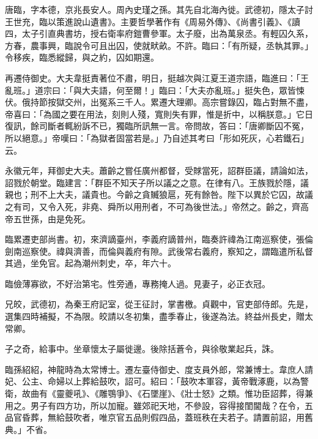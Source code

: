
\begin{pinyinscope}

 唐臨，字本德，京兆長安人。周內史瑾之孫。其先自北海內徙。武德初，隱太子討王世充，臨以策進說山遺書》。主要哲學著作有《周易外傳》、《尚書引義》、《讀四，太子引直典書坊，授右衛率府鎧曹參軍。太子廢，出為萬泉丞。有輕囚久系，方春，農事興，臨說令可且出囚，使就畎畝。不許。臨曰：「有所疑，丞執其罪。」令移疾，臨悉縱歸，與之約，囚如期還。



 再遷侍御史。大夫韋挺責著位不肅，明日，挺越次與江夏王道宗語，臨進曰：「王亂班。」道宗曰：「與大夫語，何至爾！」臨曰：「大夫亦亂班。」挺失色，眾皆悚伏。俄持節按獄交州，出冤系三千人。累遷大理卿。高宗嘗錄囚，臨占對無不盡，帝喜曰：「為國之要在用法，刻則人殘，寬則失有罪，惟是折中，以稱朕意。」它日復訊，餘司斷者輒紛訴不已，獨臨所訊無一言。帝問故，答曰：「唐卿斷囚不冤，所以絕意。」帝嘆曰：「為獄者固當若是。」乃自述其考曰「形如死灰，心若鐵石」云。



 永徽元年，拜御史大夫。蕭齡之嘗任廣州都督，受賕當死，詔群臣議，請論如法，詔戮於朝堂。臨建言：「群臣不知天子所以議之之意。在律有八。王族戮於隱，議親也；刑不上大夫，議貴也。今齡之貪贓狼扈，死有餘咎。陛下以異於它囚，故議之有司，又令入死，非堯、舜所以用刑者，不可為後世法。」帝然之。齡之，齊高帝五世孫，由是免死。



 臨累遷吏部尚書。初，來濟謫臺州，李義府謫普州，臨奏許禕為江南巡察使，張倫劍南巡察使。禕與濟善，而倫與義府有隙。武後常右義府，察知之，謂臨遣所私督其過，坐免官。起為潮州刺史，卒，年六十。



 臨儉薄寡欲，不好治第宅。性旁通，專務掩人過。見妻子，必正衣冠。



 兄皎，武德初，為秦王府記室，從王征討，掌書檄。貞觀中，官吏部侍郎。先是，選集四時補擬，不為限。皎請以冬初集，盡季春止，後遂為法。終益州長史，贈太常卿。



 子之奇，給事中。坐章懷太子屬徙邊。後除括蒼令，與徐敬業起兵，誅。



 臨孫紹紹，神龍時為太常博士。遷左臺侍御史、度支員外郎，常兼博士。韋庶人請妃、公主、命婦以上葬給鼓吹，詔可。紹曰：「鼓吹本軍容，黃帝戰涿鹿，以為警衛，故曲有《靈夔吼》、《雕鶚爭》、《石墜崖》、《壯士怒》之類。惟功臣詔葬，得兼用之。男子有四方功，所以加寵。雖郊祀天地，不參設，容得接閨閫哉？在令，五品官昏葬，無給鼓吹者，唯京官五品則假四品，蓋班秩在夫若子。請置前詔，用舊典。」不省。




\end{pinyinscope}
